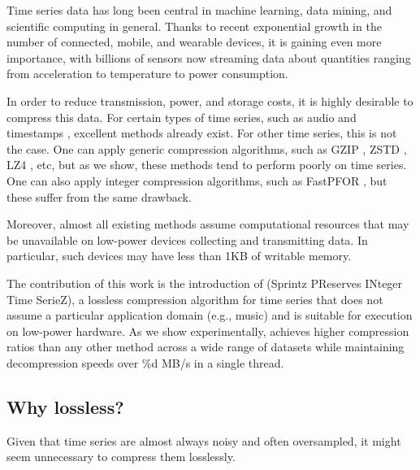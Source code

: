 
Time series data has long been central in machine learning, data mining, and scientific computing in general. Thanks to recent exponential growth in the number of connected, mobile, and wearable devices, it is gaining even more importance, with billions of sensors now streaming data about quantities ranging from acceleration to temperature to power consumption.

In order to reduce transmission, power, and storage costs, it is highly desirable to compress this data. For certain types of time series, such as audio \cite{flac, ...} and timestamps \cite{someLemire}, excellent methods already exist. For other time series, this is not the case. One can apply generic compression algorithms, such as GZIP \cite{gzip}, ZSTD \cite{zstd}, LZ4 \cite{lz4}, etc, but as we show, these methods tend to perform poorly on time series. One can also apply integer compression algorithms, such as FastPFOR \cite{fastpfor}, but these suffer from the same drawback.

Moreover, almost all existing methods assume computational resources that may be unavailable on low-power devices collecting and transmitting data. In particular, such devices may have less than 1KB of writable memory.

The contribution of this work is the introduction of \mine (Sprintz PReserves INteger Time SerieZ), a lossless compression algorithm for time series that does not assume a particular application domain (e.g., music) and is suitable for execution on low-power hardware. As we show experimentally, \mine achieves higher compression ratios than any other method across a wide range of datasets while maintaining decompression speeds over \%d MB/s in a single thread.

\subsection{Why lossless?}



Given that time series are almost always noisy and often oversampled, it might seem unnecessary to compress them losslessly. %

